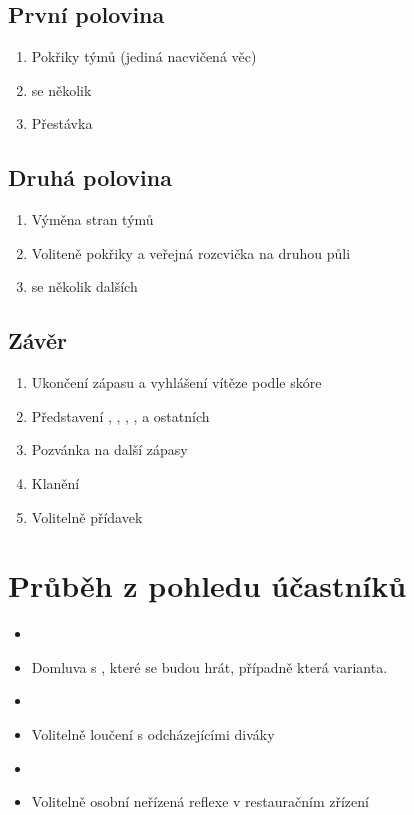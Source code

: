 \subsection{ První polovina } \begin{enumerate}
\item  Pokřiky týmů (jediná nacvičená věc)
\item  {}  se několik 
\item  Přestávka
\end{enumerate}
 
\subsection{ Druhá polovina } \begin{enumerate}
\item  Výměna stran týmů
\item  Voliteně pokřiky a veřejná rozcvička na druhou půli
\item  {} se několik dalších 
\end{enumerate}
 
\subsection{ Závěr } \begin{enumerate}
\item  Ukončení zápasu a vyhlášení vítěze podle skóre
\item  Představení , , , ,  a ostatních
\item  Pozvánka na další zápasy
\item  Klanění
\item  Volitelně přídavek
\end{enumerate}
 
\section{ Průběh z pohledu účastníků } \begin{itemize}
\item  {}
\item  Domluva s , které  se budou hrát, případně která varianta.
\item  {}
\item  Volitelně loučení s odcházejícími diváky
\item  {}
\item  Volitelně osobní neřízená reflexe v restauračním zřízení
\end{itemize}
 
